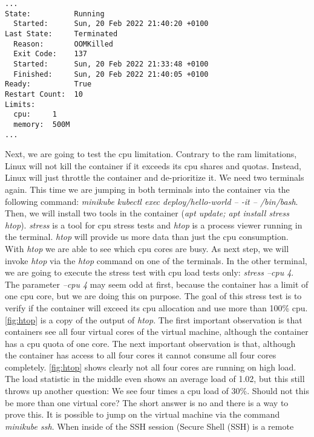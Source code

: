\documentclass[titlepage]{report}
\begin{document}
\begin{minipage}{\linewidth}
\begin{lstlisting}[caption={Snippet of the command \emph{minikube kubectl describe pod/<pod name>})},label={lst:describe_pod}]
...
State:          Running
  Started:      Sun, 20 Feb 2022 21:40:20 +0100
Last State:     Terminated
  Reason:       OOMKilled
  Exit Code:    137
  Started:      Sun, 20 Feb 2022 21:33:48 +0100
  Finished:     Sun, 20 Feb 2022 21:40:05 +0100
Ready:          True
Restart Count:  10
Limits:
  cpu:     1
  memory:  500M
...
\end{lstlisting}
\end{minipage}

Next, we are going to test the \gls{cpu} limitation. Contrary to the \gls{ram} limitations, Linux will not kill the container if it exceeds its \gls{cpu} shares and quotas.
Instead, Linux will just throttle the container and de-prioritize it. We need two terminals again. This time we are jumping in both terminals into the container via the following
command: \emph{minikube kubectl exec deploy/hello-world -- -it -- /bin/bash}. Then, we will install two tools in the container (\emph{apt update; apt install stress htop}).
\emph{stress} is a tool for \gls{cpu} stress tests and \emph{htop} is a process viewer running in the terminal. \emph{htop} will provide us more data than just the \gls{cpu} consumption.
With \emph{htop} we are able to see which \gls{cpu} cores are busy. As next step, we will invoke \emph{htop} via the \emph{htop} command on one of the terminals.
In the other terminal, we are going to execute the stress test with \gls{cpu} load tests only: \emph{stress --cpu 4}. The parameter \emph{--cpu 4} may seem odd at first, because the container
has a limit of one \gls{cpu} core, but we are doing this on purpose. The goal of this stress test is to verify if the container will exceed its \gls{cpu} allocation and use more than 100\% \gls{cpu}.
\autoref{fig:htop} is a copy of the output of \emph{htop}. The first important observation is that containers see all four virtual cores of the virtual machine, although the container has a \gls{cpu} quota
of one core. The next important observation is that, although the container has access to all four cores it cannot consume all four cores completely. \autoref{fig:htop} shows clearly not all four
cores are running on high load. The load statistic in the middle even shows an average load of 1.02, but this still throws up another question: We see four times a \gls{cpu} load of 30\%. Should not this
be more than one virtual core? The short answer is no and there is a way to prove this. It is possible to jump on the virtual machine via the command \emph{minikube ssh}. When inside of the SSH session (Secure Shell (SSH) is a remote
\end{document}

